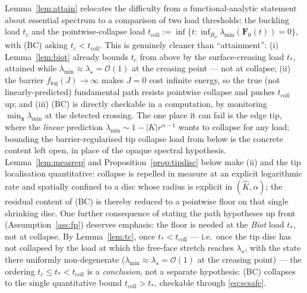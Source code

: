 \begin{remark}
    \label{rem:bc}
    Lemma~\ref{lem:attain} relocates the difficulty from a functional-analytic statement about essential spectrum to a
    comparison of two load thresholds: the buckling load $t_c$ and the pointwise-collapse load
    $t_{\mathrm{coll}}:=\inf\{t:\inf_{B_\rho}\lambda_{\min}(\bm{F}_0(t))=0\}$, with (BC) asking $t_c<t_{\mathrm{coll}}$.
    This is genuinely cleaner than ``attainment'': (i) Lemma~\ref{lem:biot} already bounds $t_c$ from above by the
    surface-creasing load $t_*$, attained while $\lambda_{\min}\approx\lambda_\star=\mathcal{O}(1)$ at the creasing point
    --- not at collapse; (ii) the barrier $f_{\log}(J)\to\infty$ makes $J=0$ cost infinite energy, so the true (not
    linearly-predicted) fundamental path resists pointwise collapse and pushes $t_{\mathrm{coll}}$ up; and (iii) (BC) is
    directly checkable in a computation, by monitoring $\min_{\bm{x}}\lambda_{\min}$ at the detected crossing. The one
    place it can fail is the edge tip, where the \emph{linear} prediction $\lambda_{\min}\sim1-|K|r^{\alpha-1}$ wants to
    collapse for any load; bounding the barrier-regularised tip collapse load from below is the concrete content left
    open, in place of the opaque spectral hypothesis. Lemma~\ref{lem:measrep} and Proposition~\ref{prop:tipdisc} below
    make (ii) and the tip localisation quantitative: collapse is repelled in measure at an explicit logarithmic rate
    and spatially confined to a disc whose radius is explicit in $(\hat K,\alpha)$; the residual content of (BC) is
    thereby reduced to a pointwise floor on that single shrinking disc. One further consequence of stating the path
    hypotheses up front (Assumption~\ref{ass:fp}) deserves emphasis: the floor is needed at the \emph{Biot} load
    $t_*$, not at collapse. By Lemma~\ref{lem:tc}, once $t_*<t_{\mathrm{coll}}$ --- i.e.\ once the tip disc has not
    collapsed by the load at which the free-face stretch reaches $\lambda_\star$, with the state there uniformly
    non-degenerate ($\lambda_{\min}\approx\lambda_\star=\mathcal O(1)$ at the creasing point) --- the ordering
    $t_c\le t_*<t_{\mathrm{coll}}$ is a \emph{conclusion}, not a separate hypothesis: (BC) collapses to the single
    quantitative bound $t_{\mathrm{coll}}>t_*$, checkable through \eqref{eq:scsafe}.
\end{remark}


